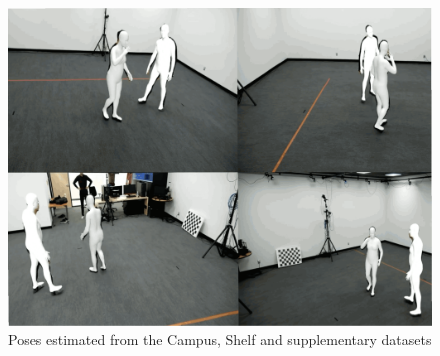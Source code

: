 \documentclass{egpubl}
\begin{document}
\begin{figure}[htb]
\begin{minipage}[b]{0.32\textwidth}
        \includegraphics[width=\linewidth]{figures/supp.png}
    \end{minipage}%
    \caption{Poses estimated from the Campus, Shelf and supplementary datasets}
    \label{fig:qualitative}
\end{figure}
  
\end{document}
